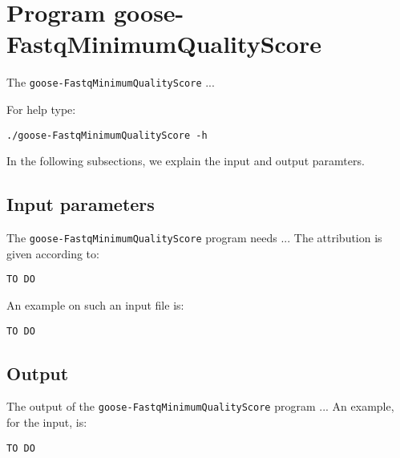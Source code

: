 \section{Program goose-FastqMinimumQualityScore}
The \texttt{goose-FastqMinimumQualityScore} ...

For help type:
\begin{lstlisting}
./goose-FastqMinimumQualityScore -h
\end{lstlisting}
In the following subsections, we explain the input and output paramters.

\subsection*{Input parameters}

The \texttt{goose-FastqMinimumQualityScore} program needs ...
The attribution is given according to:
\begin{lstlisting}
TO DO
\end{lstlisting}

An example on such an input file is:
\begin{lstlisting}
TO DO
\end{lstlisting}

\subsection*{Output}
The output of the \texttt{goose-FastqMinimumQualityScore} program ...
An example, for the input, is:
\begin{lstlisting}
TO DO
\end{lstlisting}
